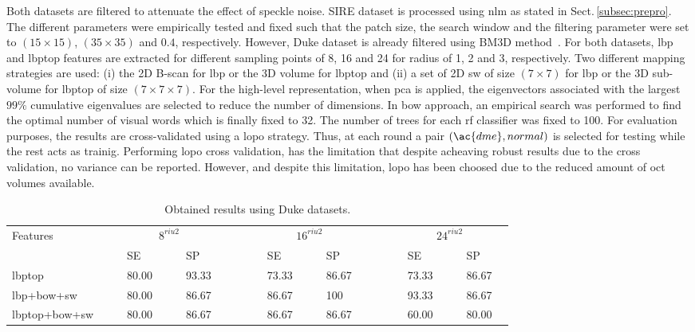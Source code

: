 Both datasets are filtered to attenuate the effect of speckle noise.
SIRE dataset is processed using \ac{nlm} as stated in Sect.\,\ref{subsec:prepro}.
The different parameters were empirically tested and fixed such that the patch size, the search window and the filtering parameter were set to $(15 \times 15)$, $(35 \times 35)$ and $0.4$, respectively.
However, Duke dataset is already filtered using BM3D method~\cite{Srinivasan2014}.
For both datasets, \ac{lbp} and \ac{lbptop} features are extracted for different sampling points of 8, 16 and 24 for radius of 1, 2 and 3, respectively.
Two different mapping strategies are used: (i) the 2D B-scan for \ac{lbp} or the 3D volume for \ac{lbptop} and (ii) a set of 2D \ac{sw} of size $(7 \times 7)$ for \ac{lbp} or the 3D sub-volume for \ac{lbptop} of size $(7 \times 7 \times 7)$.
For the high-level representation, when \ac{pca} is applied, the eigenvectors associated with the largest $99\%$ cumulative eigenvalues are selected to reduce the number of dimensions. In \ac{bow} approach, an empirical search was performed to find the optimal number of visual words which is finally fixed to 32.
The number of trees for each \ac{rf} classifier was fixed to 100.
For evaluation purposes, the results are cross-validated using a \ac{lopo} strategy. Thus, at each round a pair $(\ac{dme}, normal)$ is selected for testing while the rest acts as trainig.
Performing \ac{lopo} cross validation, has the limitation that despite acheaving robust results due to the cross validation, no variance can be reported.
However, and despite this limitation, \ac{lopo} has been choosed due to the reduced amount of \ac{oct} volumes available.

\begin{tiny}
  \begin{table}[Ht]
\caption{Obtained results using Duke datasets.}%
\centering
\begin{tabular}{lcclcclcccclcclcccclcclc}
\toprule
Features 	& & &\multicolumn{4}{c}{$8^{riu2}$}&	 & & & &\multicolumn{4}{c}{$16^{riu2}$}& & & & &\multicolumn{4}{c}{$24^{riu2}$} &\\
  \cmidrule(l){2-8}  \cmidrule(l){10-16}  \cmidrule(l){18-24}
	       & & & SE & & & SP & & & & & SE & & & SP & & & & & SE & & & SP & \\
\midrule
 	\ac{lbptop}				& & & 80.00& & & 93.33 & & & & & 73.33 & & & 86.67 & & & & & 73.33 & & & 86.67 & \\
	\ac{lbp}+\ac{bow}+\acs{sw}		& & & 80.00 & & & 86.67 & & & & & 86.67 & & & 100 & & & & &93.33 & & & 86.67 & \\
	\ac{lbptop}+\ac{bow}+\acs{sw}		& & & 80.00 & & & 86.67 & & & & & 86.67 & & & 86.67 & & & & & 60.00 & & & 80.00 & \\
\bottomrule
\end{tabular}
\label{tab:Duke-data}
\end{table}
\end{tiny}

